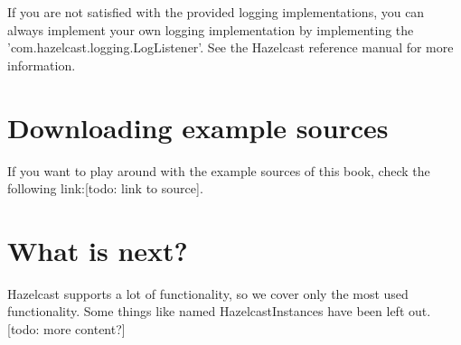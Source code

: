 If you are not satisfied with the provided logging implementations, you can always implement your own logging implementation by implementing the 'com.hazelcast.logging.LogListener'. See the Hazelcast reference manual for more information.

\section{Downloading example sources}
If you want to play around with the example sources of this book, check the following link:[todo: link to source]. 

\section{What is next?}
Hazelcast supports a lot of functionality, so we cover only the most used functionality. Some things like named HazelcastInstances have been left out. [todo: more content?]
